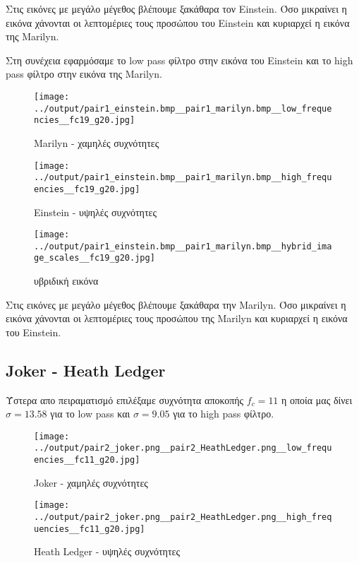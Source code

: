 \documentclass[11pt]{scrartcl} %
\begin{document}
Στις εικόνες με μεγάλο μέγεθος βλέπουμε ξακάθαρα τον Einstein. Όσο μικραίνει η εικόνα χάνονται οι λεπτομέριες τους προσώπου του Einstein και κυριαρχεί η εικόνα της Marilyn.

Στη συνέχεια εφαρμόσαμε το low pass φίλτρο στην εικόνα του Einstein και το high pass φίλτρο στην εικόνα της Marilyn.

\begin{figure}[H]
  \begin{minipage}[c]{8cm}
    \texttt{[image: ../output/pair1\_einstein.bmp\_\_pair1\_marilyn.bmp\_\_low\_frequencies\_\_fc19\_g20.jpg]}
    \caption{Marilyn - χαμηλές συχνότητες}
  \end{minipage}
  \begin{minipage}[c]{8cm}
    \texttt{[image: ../output/pair1\_einstein.bmp\_\_pair1\_marilyn.bmp\_\_high\_frequencies\_\_fc19\_g20.jpg]}
    \caption{Einstein - υψηλές συχνότητες}
  \end{minipage}
\end{figure}

\begin{figure}[H]
  \texttt{[image: ../output/pair1\_einstein.bmp\_\_pair1\_marilyn.bmp\_\_hybrid\_image\_scales\_\_fc19\_g20.jpg]}
  \caption{υβριδική εικόνα}
\end{figure}

Στις εικόνες με μεγάλο μέγεθος βλέπουμε ξακάθαρα την Marilyn. Όσο μικραίνει η εικόνα χάνονται οι λεπτομέριες τους προσώπου της Marilyn και κυριαρχεί η εικόνα του Einstein.

\subsection{Joker - Heath Ledger}

Ύστερα απο πειραματισμό επιλέξαμε συχνότητα αποκοπής $f_c = 11$ η οποία μας δίνει $\sigma = 13.58$ για το low pass και $\sigma = 9.05$ για το high pass φίλτρο.

\begin{figure}[H]
  \begin{minipage}[c]{9cm}
    \texttt{[image: ../output/pair2\_joker.png\_\_pair2\_HeathLedger.png\_\_low\_frequencies\_\_fc11\_g20.jpg]}
    \caption{Joker - χαμηλές συχνότητες}
  \end{minipage}
  \begin{minipage}[c]{9cm}
    \texttt{[image: ../output/pair2\_joker.png\_\_pair2\_HeathLedger.png\_\_high\_frequencies\_\_fc11\_g20.jpg]}
    \caption{Heath Ledger - υψηλές συχνότητες}
  \end{minipage}
\end{figure}
\end{document}
